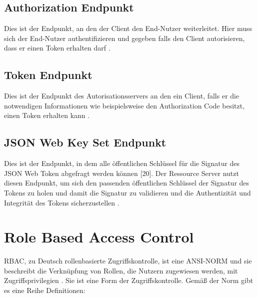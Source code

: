 \subsection{Authorization Endpunkt}
\label{sec:OAuth2EndpunktedesAutorisationsservers:AuthorizationEndpunkt}
Dies ist der Endpunkt, an den der Client den End-Nutzer weiterleitet. Hier muss sich der 
End-Nutzer authentifizieren und gegeben falls den Client autorisieren, dass er einen Token erhalten darf \citep{oauth2:2012}.

\subsection{Token Endpunkt}
\label{sec:OAuth2EndpunktedesAutorisationsservers:TokenEndpunkt}
Dies ist der Endpunkt des Autorisationsservers an den ein Client, falls er die notwendigen 
Informationen wie beispielsweise den Authorization Code besitzt, einen Token erhalten 
kann \citep{oauth2:2012}.

\subsection{JSON Web Key Set Endpunkt}
\label{sec:OAuth2EndpunktedesAutorisationsservers:JSONWebKeySet(JWKS)Endpunkt}
Dies ist der Endpunkt, in dem alle öffentlichen Schlüssel für die Signatur des JSON Web 
Token abgefragt werden können [20]. Der Ressource Server nutzt diesen Endpunkt, um sich 
den passenden öffentlichen Schlüssel der Signatur des Tokens zu holen und damit die 
Signatur zu validieren und die Authentizität und Integrität des Tokens sicherzustellen \citep{jwk:2015}.

\section{Role Based Access Control}
\label{sec:Zugriffskontrolle:RoleBasedAccessControl(RBAC)}
\ac{RBAC}, zu Deutsch rollenbasierte Zugriffskontrolle, ist eine ANSI-NORM 
und sie beschreibt die Verknüpfung von Rollen, die Nutzern zugewiesen werden, mit 
Zugriffsprivilegien \citep{rbac:2006}. Sie ist eine Form der Zugriffskontrolle. Gemäß der Norm gibt es eine Reihe Definitionen:

